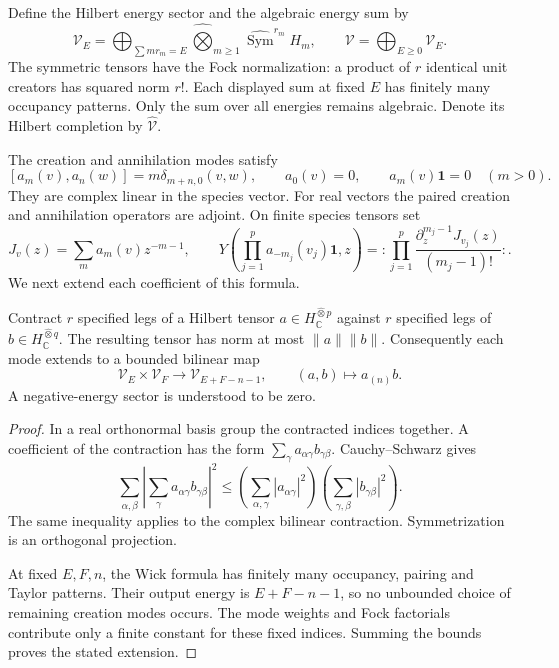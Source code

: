 Define the Hilbert energy sector and the algebraic
energy sum by
\begin{equation}\label{v4-eq:singular-hilbert-sectors}
 \mathcal V_E=
    \bigoplus_{\sum m r_m=E}
       \widehat{\bigotimes}_{m\geq1}
              \widehat{\operatorname{Sym}}^{r_m}H_m,
 \qquad
 \mathcal V=\bigoplus_{E\geq0}\mathcal V_E.
\end{equation}
The symmetric tensors have the Fock normalization:
a product of \(r\) identical unit creators has
squared norm \(r!\). Each displayed sum at fixed
\(E\) has finitely many occupancy patterns. Only
the sum over all energies remains algebraic.
Denote its Hilbert completion by
\(\widehat{\mathcal V}\).

The creation and annihilation modes satisfy
\[
 [a_m(v),a_n(w)]=m\delta_{m+n,0}(v,w),
 \qquad a_0(v)=0,
 \qquad a_m(v)\mathbf1=0\quad(m>0).
\]
They are complex linear in the species vector.
For real vectors the paired creation and annihilation
operators are adjoint. On finite species tensors set
\[
 J_v(z)=\sum_m a_m(v)z^{-m-1},
 \qquad
 Y\left(\prod_{j=1}^p a_{-m_j}(v_j)\mathbf1,z\right)
   =:\prod_{j=1}^p
         \frac{\partial_z^{m_j-1}J_{v_j}(z)}{(m_j-1)!}:.
\]
We next extend each coefficient of this formula.

\begin{lemma}\label{v4-lem:singular-cross-contractions}
Contract \(r\) specified legs of a Hilbert tensor
\(a\in H_{\mathbb C}^{\widehat\otimes p}\) against
\(r\) specified legs of
\(b\in H_{\mathbb C}^{\widehat\otimes q}\).
The resulting tensor has norm at most
\(\|a\|\|b\|\). Consequently each mode extends
to a bounded bilinear map
\begin{equation}\label{v4-eq:singular-mode-bound}
 \mathcal V_E\times\mathcal V_F
   \longrightarrow\mathcal V_{E+F-n-1},
 \qquad (a,b)\longmapsto a_{(n)}b.
\end{equation}
A negative-energy sector is understood to be zero.
\end{lemma}

\begin{proof}
In a real orthonormal basis group the contracted
indices together. A coefficient of the contraction
has the form \(\sum_\gamma a_{\alpha\gamma}
b_{\gamma\beta}\). Cauchy--Schwarz gives
\[
 \sum_{\alpha,\beta}
     \left|\sum_\gamma a_{\alpha\gamma}b_{\gamma\beta}\right|^2
 \leq
 \left(\sum_{\alpha,\gamma}|a_{\alpha\gamma}|^2\right)
 \left(\sum_{\gamma,\beta}|b_{\gamma\beta}|^2\right).
\]
The same inequality applies to the complex bilinear
contraction. Symmetrization is an orthogonal projection.

At fixed \(E,F,n\), the Wick formula has finitely
many occupancy, pairing and Taylor patterns. Their
output energy is \(E+F-n-1\), so no unbounded
choice of remaining creation modes occurs. The
mode weights and Fock factorials contribute only
a finite constant for these fixed indices.
Summing the bounds proves the stated extension.
\end{proof}

